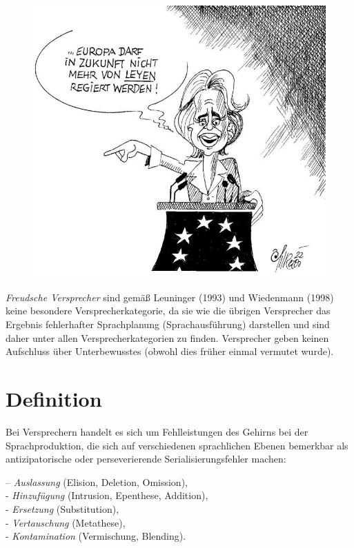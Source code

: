 \documentclass[
  letterpaper,
]{scrbook}
\begin{document}
\begin{figure}

{\centering 

\href{https://www.vn.at/vorarlberg/2022/09/16/freudscher-versprecher.vn}{\includegraphics[width=1\textwidth,height=\textheight]{./pictures/Europa_von_Leyen_regiert.jpg}}

}

\end{figure}

\emph{Freudsche Versprecher} sind gemäß Leuninger (1993) und Wiedenmann
(1998) keine besondere Versprecherkategorie, da sie wie die übrigen
Versprecher das Ergebnis fehlerhafter Sprachplanung (Sprachausführung)
darstellen und sind daher unter allen Versprecherkategorien zu finden.
Versprecher geben keinen Aufschluss über Unterbewusstes (obwohl dies
früher einmal vermutet wurde).

\hypertarget{definition}{%
\section{Definition}\label{definition}}

Bei Versprechern handelt es sich um Fehlleistungen des Gehirns bei der
Sprachproduktion, die sich auf verschiedenen sprachlichen Ebenen
bemerkbar als antizipatorische oder perseverierende
Serialisierungsfehler machen:

-- \emph{Auslassung} (Elision, Deletion, Omission),\\
- \emph{Hinzufügung} (Intrusion, Epenthese, Addition),\\
- \emph{Ersetzung} (Substitution),\\
- \emph{Vertauschung} (Metathese),\\
- \emph{Kontamination} (Vermischung, Blending).
\end{document}
